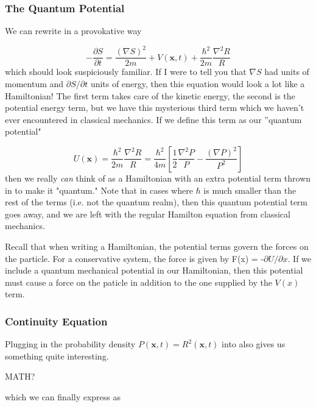 \subsubsection{The Quantum Potential}

We can rewrite  in a provokative way 

\begin{equation}
\label{BohmHamiltonian}
- \frac{\partial S}{\partial t} = \frac{(\nabla S)^2}{2 m} + V(\mathbf{x},t) + \frac{\hbar^2}{2m}\frac{\nabla^2 R}{R}
\end{equation}
which should look suspiciously familiar. If I were to tell you that $\nabla S$ had units of momentum and $\partial S/\partial t$ units of energy, then this equation would look a lot like a Hamiltonian! The first term takes care of the kinetic energy, the second is the potential energy term, but we have this mysterious third term which we haven't ever encountered in classical mechanics. If we define this term as our ''quantum potential" 

\begin{equation}
\label{QuantumPotential}
U(\mathbf{x}) =  \frac{\hbar^2}{2m}\frac{\nabla^2 R}{R} = \frac{\hbar^2}{4m}\left[\frac{1}{2} \frac{\nabla^2 P}{P} - \frac{(\nabla P)^2}{P^2}\right] 
\end{equation}
then we really \textit{can} think of  as a Hamiltonian with an extra potential term thrown in to make it "quantum." Note that in cases where $\hbar$ is much smaller than the rest of the terms (i.e. not the quantum realm), then this quantum potential term goes away, and we are left with the regular Hamilton equation from classical mechanics. 

Recall that when writing a Hamiltonian, the potential terms govern the forces on the particle. For a conservative system, the force is given by F(x) = -$\partial U/\partial x$. If we include a quantum mechanical potential in our Hamiltonian, then this potential must cause a force on the paticle in addition to the one supplied by the $V(x)$ term. 


\subsubsection{Continuity Equation}
Plugging in the probability density $P(\mathbf{x},t) = R^2(\mathbf{x},t)$ into  also gives us something quite interesting.

MATH?

which we can finally express as 

